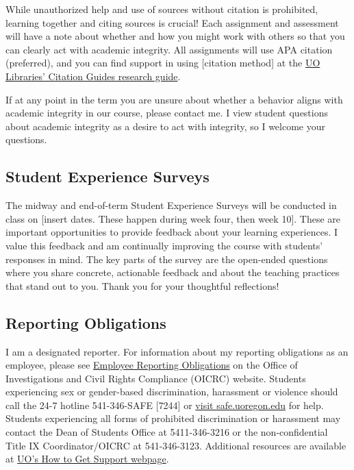 \documentclass[
  letterpaper,
  DIV=11,
  numbers=noendperiod]{scrartcl}
\begin{document}
While unauthorized help and use of sources without citation is
prohibited, learning together and citing sources is crucial! Each
assignment and assessment will have a note about whether and how you
might work with others so that you can clearly act with academic
integrity. All assignments will use APA citation (preferred), and you
can find support in using {[}citation method{]} at the
\href{https://researchguides.uoregon.edu/citing-plagiarism/whycite\#s-lg-box-8000742}{UO
Libraries' Citation Guides research guide}.

If at any point in the term you are unsure about whether a behavior
aligns with academic integrity in our course, please contact me. I view
student questions about academic integrity as a desire to act with
integrity, so I welcome your questions.

\hypertarget{student-experience-surveys}{%
\subsection{Student Experience
Surveys}\label{student-experience-surveys}}

The midway and end-of-term Student Experience Surveys will be conducted
in class on {[}insert dates. These happen during week four, then week
10{]}. These are important opportunities to provide feedback about your
learning experiences. I value this feedback and am continually improving
the course with students' responses in mind. The key parts of the survey
are the open-ended questions where you share concrete, actionable
feedback and about the teaching practices that stand out to you. Thank
you for your thoughtful reflections!

\hypertarget{reporting-obligations}{%
\subsection{Reporting Obligations}\label{reporting-obligations}}

I am a designated reporter. For information about my reporting
obligations as an employee, please see
\href{https://investigations.uoregon.edu/employee-responsibilities\#employee-obligations}{Employee
Reporting Obligations} on the Office of Investigations and Civil Rights
Compliance (OICRC) website. Students experiencing sex or gender-based
discrimination, harassment or violence should call the 24-7 hotline
541-346-SAFE {[}7244{]} or \href{https://safe.uoregon.edu/}{visit
safe.uoregon.edu} for help. Students experiencing all forms of
prohibited discrimination or harassment may contact the Dean of Students
Office at 5411-346-3216 or the non-confidential Title IX
Coordinator/OICRC at 541-346-3123. Additional resources are available at
\href{https://investigations.uoregon.edu/how-get-support}{UO's How to
Get Support webpage}.
\end{document}
